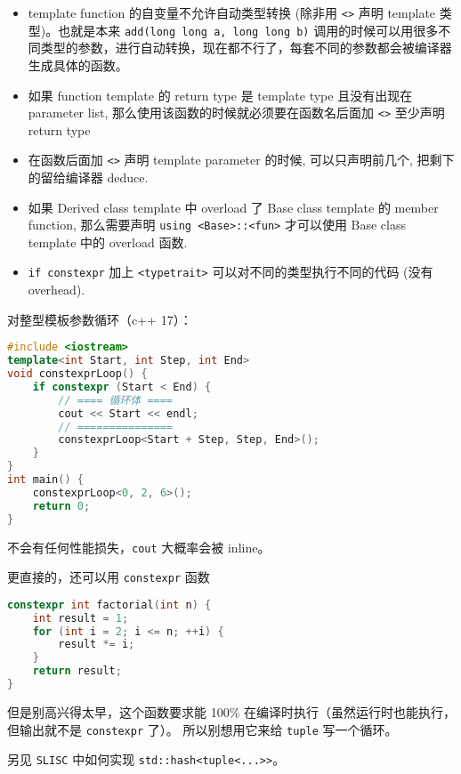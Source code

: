 
\begin{issues}
\issueDraft
\end{issues}

\begin{itemize}
\item template function 的自变量不允许自动类型转换 (除非用 \verb`<>` 声明 template 类型)。也就是本来 \verb`add(long long a, long long b)` 调用的时候可以用很多不同类型的参数，进行自动转换，现在都不行了，每套不同的参数都会被编译器生成具体的函数。
\item 如果 function template 的 return type 是 template type 且没有出现在 parameter list, 那么使用该函数的时候就必须要在函数名后面加 \verb`<>` 至少声明 return type
\item 在函数后面加 \verb`<>` 声明 template parameter 的时候, 可以只声明前几个, 把剩下的留给编译器 deduce.
\item 如果 Derived class template 中 overload 了 Base class template 的 member function, 那么需要声明 \verb`using <Base>::<fun>` 才可以使用 Base class template 中的 overload 函数.
\item \verb`if constexpr` 加上 \verb`<typetrait>` 可以对不同的类型执行不同的代码 (没有 overhead).
\end{itemize}

对整型模板参数循环（c++ 17）：
\begin{lstlisting}[language=cpp]
#include <iostream>
template<int Start, int Step, int End>
void constexprLoop() {
    if constexpr (Start < End) {
		// ==== 循环体 ====
        cout << Start << endl;
		// ===============
        constexprLoop<Start + Step, Step, End>();
    }
}
int main() {
    constexprLoop<0, 2, 6>();
    return 0;
}
\end{lstlisting}
不会有任何性能损失，\verb`cout` 大概率会被 inline。

更直接的，还可以用 \verb`constexpr` 函数
\begin{lstlisting}[language=cpp]
constexpr int factorial(int n) {
    int result = 1;
    for (int i = 2; i <= n; ++i) {
        result *= i;
    }
    return result;
}
\end{lstlisting}
但是别高兴得太早，这个函数要求能 100\% 在编译时执行（虽然运行时也能执行，但输出就不是 \verb`constexpr` 了）。 所以别想用它来给 \verb`tuple` 写一个循环。

另见 \verb`SLISC` 中如何实现 \verb`std::hash<tuple<...>>`。

